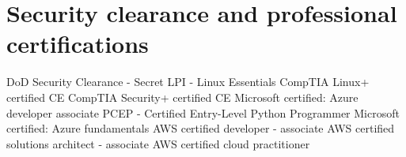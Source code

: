 \section{Security clearance and professional certifications}
{%
}
{%
	DoD Security Clearance - Secret}
{}
{%
}
{%
	LPI - Linux Essentials}
{}
{%
}
{%
	CompTIA Linux+ certified CE}
{}
{%
}
{%
	CompTIA Security+ certified CE}
{}
{%
}
{%
	Microsoft certified: Azure developer associate}
{}
{%
}
{%
	PCEP - Certified Entry-Level Python Programmer}
{}
{%
}
{%
	Microsoft certified: Azure fundamentals}
{}
{%
}
{%
	AWS certified developer - associate}
{}
{%
}
{%
	AWS certified solutions architect - associate}
{}
{%
}
{%
	AWS certified cloud practitioner}
{}
